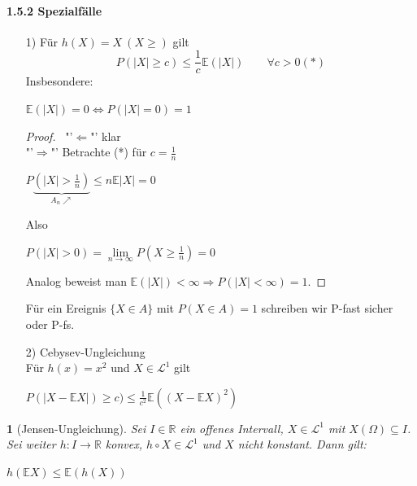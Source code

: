 \documentclass[10pt,a4paper]{report}
\numberwithin{equation}{section}
\numberwithin{figure}{section}
\theoremstyle{plain}
\theoremstyle{definition}
\theoremstyle{remark}
\theoremstyle{plain}
\newtheorem{prop}[thm]{\protect\propositionname}
\providecommand{\propositionname}{Satz}
\newcommand{\1}{ \mathbb{1} } %
\begin{document}
\paragraph{1.5.2 Spezialfälle}
\begin{itemize}
\item[1)] Für $h(X)=X ~(X\geq)$ gilt
  \[P(|X|\geq c) \leq \frac{1}{c}\mathbb{E}(|X|) \qquad \forall c >0 (*)\]
  Insbesondere:
  \begin{center}
    $\mathbb{E}(|X|)=0 \Leftrightarrow P(|X|=0)=1 $
  \end{center}
  \begin{proof} \
    "'$\Leftarrow$"' klar\\
    "'$\Rightarrow$"' Betrachte (*) für $c=\frac{1}{n}$
    \begin{center}
      $P\underbrace{\left(|X|>\frac{1}{n}\right)}_{A_n\nearrow} \leq
      n\mathbb{E}|X|=0$
    \end{center}
    Also
    \begin{center}
      $P(|X|>0)=\lim\limits_{n \to \infty}P\left(X\geq
        \frac{1}{n}\right)=0$
    \end{center}
    Analog beweist man $\mathbb{E}(|X|)<\infty \Rightarrow
    P(|X|<\infty)=1$.
  \end{proof}
  Für ein Ereignis $\{X\in A\}$ mit $P(X \in A)=1$ schreiben wir P-fast sicher oder P-fs.
\item[2)] Cebysev-Ungleichung\\
  Für $h(x)=x^2$ und $X \in \mathcal{L}^1$ gilt
  \begin{center}
    $P(|X-\mathbb{E}X|)\geq c) \leq
    \frac{1}{c^2}\mathbb{E}((X-\mathbb{E}X)^2)$
  \end{center}
\end{itemize}
\begin{prop}[Jensen-Ungleichung] 
  Sei $I\in \mathbb{R}$ ein offenes Intervall, $X \in \mathcal{L}^1$
  mit $X(\Omega)\subseteq I$. Sei weiter $h:I\to\mathbb{R}$ konvex,
  $h\circ X \in \mathcal{L}^1$ und $X$ nicht konstant. Dann gilt:
  \begin{center}
    $h(\mathbb{E}X)\leq \mathbb{E}(h(X))$
  \end{center}
\end{prop}
\end{document}
